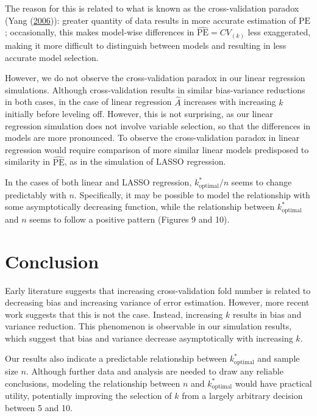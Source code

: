 \documentclass[
  12pt,
]{article}
\begin{document}
The reason for this is related to what is known as the cross-validation
paradox (Yang (\protect\hyperlink{ref-Yang2006}{2006})): greater
quantity of data results in more accurate estimation of \(\mathrm{PE}\);
occasionally, this makes model-wise differences in
\(\mathrm{\widehat{PE}} = CV_{(k)}\) less exaggerated, making it more
difficult to distinguish between models and resulting in less accurate
model selection.

However, we do not observe the cross-validation paradox in our linear
regression simulations. Although cross-validation results in similar
bias-variance reductions in both cases, in the case of linear regression
\(\hat{A}\) increases with increasing \(k\) initially before leveling
off. However, this is not surprising, as our linear regression
simulation does not involve variable selection, so that the differences
in models are more pronounced. To observe the cross-validation paradox
in linear regression would require comparison of more similar linear
models predisposed to similarity in \(\widehat{\mathrm{PE}}\), as in the
simulation of LASSO regression.

In the cases of both linear and LASSO regression,
\(k_\mathrm{optimal}^*/n\) seems to change predictably with \(n\).
Specifically, it may be possible to model the relationship with some
asymptotically decreasing function, while the relationship between
\(k_\mathrm{optimal}^*\) and \(n\) seems to follow a positive pattern
(Figures 9 and 10).

\hypertarget{conclusion}{%
\section{Conclusion}\label{conclusion}}

Early literature suggests that increasing cross-validation fold number
is related to decreasing bias and increasing variance of error
estimation. However, more recent work suggests that this is not the
case. Instead, increasing \(k\) results in bias and variance reduction.
This phenomenon is observable in our simulation results, which suggest
that bias and variance decrease asymptotically with increasing \(k\).

Our results also indicate a predictable relationship between
\(k_\mathrm{optimal}^*\) and sample size \(n\). Although further data
and analysis are needed to draw any reliable conclusions, modeling the
relationship between \(n\) and \(k_\mathrm{optimal}^*\) would have
practical utility, potentially improving the selection of \(k\) from a
largely arbitrary decision between 5 and 10.
\end{document}
